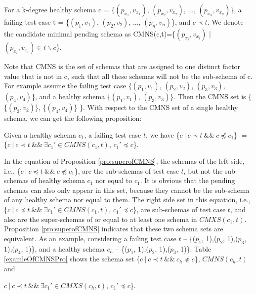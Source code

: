 \documentclass{sig-alternate-05-2015}
\begin{document}
{\begin{definition}
For a k-degree healthy schema c = \{$(p_{x_{1}}, v_{x_{1}})$, $(p_{x_{2}}, v_{x_{2}})$, ..., $(p_{x_{k}}, v_{x_{k}})$\}, a failing test case t = \{$(p_{1}, v_{1})$, $(p_{2}, v_{2})$, ..., $(p_{n}, v_{n})$\}, and $c \prec t$. We denote the candidate minimal pending schema as CMNS(c,t)=\{$(p_{x_{i}}, v_{x_{i}})$ | $(p_{x_{i}}, v_{x_{i}}) \in t \backslash c $\}.
\end{definition}

Note that CMNS is the set of schemas that are assigned to one distinct factor value that is not in c, such that all these schemas will not be the sub-schema of c. For example assume the failing test case \{$(p_{1}, v_{1})$, $(p_{2}, v_{2})$, $(p_{3}, v_{3})$, $(p_{4}, v_{4})$\}, and a healthy schema \{$(p_{1}, v_{1})$, $(p_{3}, v_{3})$\}. Then the CMNS set is \{ \{$(p_{2}, v_{2})$\}, \{$(p_{4}, v_{4})$\} \}.  With respect to the CMNS set of a single healthy schema, we can get the following proposition:

\begin{proposition}\label{pro:superofCMNS}
Given a healthy schema $c_{1}$, a failing test case $t$, we have \{$c\ |\ c \prec t\ \&\&\ c \npreceq c_{1}$\} $=$  \{$ c\ |\ c \prec t \  \&\& \ \exists c_{1}' \in CMNS(c_{1}, t)$, $c_{1}' \preceq c$\}.
\end{proposition}

In the equation of Proposition \ref{pro:superofCMNS}, the schemas of the left side, i.e., \{$c\ |\ c \preceq t\ \&\&\ c \npreceq c_{1}$\}, are the sub-schemas of test case $t$, but not the sub-schemas of healthy schema $c_{1}$ nor equal to $c_{1}$.  It is obvious that the pending schemas can also only appear in this set, because they cannot be the sub-schema of any healthy schema nor equal to them. The right side set in this equation, i.e.,\{$ c\ |\ c \preceq t \  \&\& \ \exists c_{1}' \in CMNS(c_{1}, t)$, $c_{1}' \preceq c$\}, are sub-schemas of test case $t$, and also are the super-schemas of or equal to at least one schema in $CMXS(c_{1}, t)$. Proposition \ref{pro:superofCMNS} indicates that these two schema sets are equivalent. As an example, considering a failing test case $t$ -- \{($p_{1}$, 1),($p_{2}$, 1),($p_{3}$, 1),($p_{4}$, 1)\}, and a healthy schema $c_{h}$ --  \{($p_{1}$, 1),($p_{2}$, 1),($p_{3}$, 1)\}. Table \ref{examleOfCMNSPro} shows the schema set  \{$c\ |\ c \prec t\ \&\&\ c_{h} \npreceq c$\}, $CMNS(c_{h}, t)$ and {$ c\ |\ c \prec t\ \&\& \ \exists c_{1}' \in CMXS(c_{h}, t)$, $c_{1}' \preceq c$\}.

}}
\end{document}
